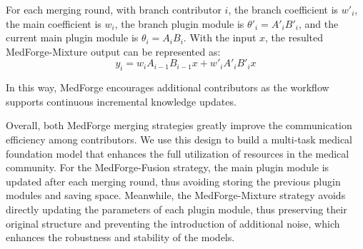 For each merging round, with branch contributor $i$, the branch coefficient is $w'_i$, the main coefficient is $w_i$, the branch plugin module is $\theta'_i=A'_iB'_i$, and the current main plugin module is $\theta_i=A_iB_i$. With the input $x$, the resulted MedForge-Mixture output can be represented as:
\begin{equation}
y_{i}=w_i A_{i-1} B_{i-1} x+w'_i A'_i B'_i x
\end{equation}

In this way, MedForge encourages additional contributors as the workflow supports continuous incremental knowledge updates.

Overall, both MedForge merging strategies greatly improve the communication efficiency among contributors. We use this design to build a multi-task medical foundation model that enhances the full utilization of resources in the medical community. For the MedForge-Fusion strategy, the main plugin module is updated after each merging round, thus avoiding storing the previous plugin modules and saving space. Meanwhile, the MedForge-Mixture strategy avoids directly updating the parameters of each plugin module, thus preserving their original structure and preventing the introduction of additional noise, which enhances the robustness and stability of the models.
